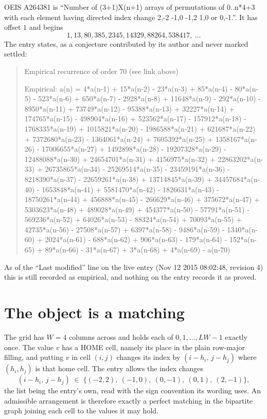 \documentclass[11pt,a4paper]{article}
\theoremstyle{plain}
\theoremstyle{definition}
\begin{document}
OEIS A264381 is ``Number of (3+1)X(n+1) arrays of permutations of 0..n*4+3 with each element having directed index change 2,-2 -1,0 -1,2 1,0 or 0,-1.''. It has offset $1$ and begins
\[
1, 13, 80, 385, 2345, 14329, 88264, 538417,\ \dots
\]
The entry states, as a conjecture contributed by its author and never marked settled:
\begin{quote}
Empirical recurrence of order 70 (see link above)

Empirical: a(n) = 4*a(n-1) + 15*a(n-2) - 23*a(n-3) + 85*a(n-4) - 80*a(n-5) - 523*a(n-6) + 650*a(n-7) - 2928*a(n-8) + 11648*a(n-9) - 292*a(n-10) - 8950*a(n-11) + 73749*a(n-12) - 95388*a(n-13) + 32227*a(n-14) + 174765*a(n-15) - 498904*a(n-16) + 523562*a(n-17) - 157912*a(n-18) - 1768335*a(n-19) + 1015821*a(n-20) - 1986588*a(n-21) + 621687*a(n-22) + 7372680*a(n-23) - 1364061*a(n-24) + 7605392*a(n-25) + 1358167*a(n-26) - 17006655*a(n-27) + 1492898*a(n-28) - 19207328*a(n-29) - 12488088*a(n-30) + 24654701*a(n-31) + 4156975*a(n-32) + 22863202*a(n-33) + 26735865*a(n-34) - 25269514*a(n-35) - 23459191*a(n-36) - 8218390*a(n-37) - 22659261*a(n-38) + 13714845*a(n-39) + 34457684*a(n-40) - 1653848*a(n-41) + 5581470*a(n-42) - 1826631*a(n-43) - 18750261*a(n-44) + 456888*a(n-45) - 266629*a(n-46) + 375672*a(n-47) + 5303623*a(n-48) + 489028*a(n-49) + 454377*a(n-50) - 57791*a(n-51) - 569236*a(n-52) + 64026*a(n-53) - 88324*a(n-54) + 70093*a(n-55) + 42735*a(n-56) - 27508*a(n-57) + 6397*a(n-58) - 9486*a(n-59) - 1340*a(n-60) + 2024*a(n-61) - 688*a(n-62) + 906*a(n-63) - 179*a(n-64) - 152*a(n-65) + 89*a(n-66) - 31*a(n-67) + 3*a(n-68) + 4*a(n-69) - a(n-70)
\end{quote}
As of the ``Last modified'' line on the live entry (Nov 12 2015 08:02:48, revision 4) this is still
recorded as empirical, and nothing on the entry records it as proved.

\section{The object is a matching}

The grid has $W=4$ columns across and holds each of $0,1,\dots,LW-1$ exactly once. The value
$v$ has a HOME cell, namely its place in the plain row-major filling, and putting $v$ in cell
$(i,j)$ changes its index by $(i-h_i,\,j-h_j)$ where $(h_i,h_j)$ is that home cell. The entry
allows the index changes
\[
(i-h_i,\,j-h_j)\;\in\;\{(-2,2),\ (-1,0),\ (0,-1),\ (0,1),\ (2,-1)\},
\]
the list being the entry's own, read with the sign convention its wording uses. An admissible
arrangement is therefore exactly a perfect matching in the bipartite graph joining each cell to
the values it may hold.
\end{document}
